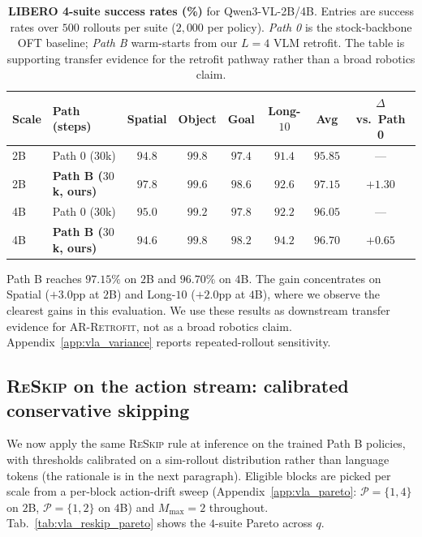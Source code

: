 \documentclass{article}
\newcommand{\reskip}{\textsc{ReSkip}}
\newcommand{\retrofit}{\textsc{AR-Retrofit}}
\begin{document}
\begin{table}[t]
\caption{\textbf{LIBERO 4-suite success rates (\%)} for Qwen3-VL-2B/4B. Entries are success rates over $500$ rollouts per suite ($2{,}000$ per policy). \emph{Path 0} is the stock-backbone OFT baseline; \emph{Path B} warm-starts from our $L{=}4$ VLM retrofit. The table is supporting transfer evidence for the retrofit pathway rather than a broad robotics claim.}
\label{tab:vla_libero}
\centering\small
\setlength{\tabcolsep}{4pt}
\begin{tabular}{llcccccc}
\toprule
Scale & Path (steps) & Spatial & Object & Goal & Long-$10$ & \textbf{Avg} & $\Delta$ vs.\ Path 0 \\
\midrule
2B & Path 0 ($30$k)                & $94.8$ & $99.8$ & $97.4$ & $91.4$ & $95.85$ & --- \\
2B & \textbf{Path B ($30$k, ours)} & $\mathbf{97.8}$ & $99.6$ & $\mathbf{98.6}$ & $\mathbf{92.6}$ & $\mathbf{97.15}$ & $\mathbf{+1.30}$ \\
\midrule
4B & Path 0 ($30$k)                & $95.0$ & $99.2$ & $97.8$ & $92.2$ & $96.05$ & --- \\
4B & \textbf{Path B ($30$k, ours)} & $94.6$ & $\mathbf{99.8}$ & $\mathbf{98.2}$ & $\mathbf{94.2}$ & $\mathbf{96.70}$ & $\mathbf{+0.65}$ \\
\bottomrule
\end{tabular}
\end{table}

Path B reaches $97.15\%$ on $2$B and $96.70\%$ on $4$B. The gain concentrates on Spatial ($+3.0$pp at $2$B) and Long-$10$ ($+2.0$pp at $4$B), where we observe the clearest gains in this evaluation. We use these results as downstream transfer evidence for \retrofit{}, not as a broad robotics claim. Appendix~\ref{app:vla_variance} reports repeated-rollout sensitivity.

\subsection{\reskip{} on the action stream: calibrated conservative skipping}
\label{sec:vla_reskip}

We now apply the same \reskip{} rule at inference on the trained Path B policies, with thresholds calibrated on a sim-rollout distribution rather than language tokens (the rationale is in the next paragraph). Eligible blocks are picked per scale from a per-block action-drift sweep (Appendix~\ref{app:vla_pareto}: $\mathcal{P}{=}\{1,4\}$ on $2$B, $\mathcal{P}{=}\{1,2\}$ on $4$B) and $M_{\max}{=}2$ throughout. Tab.~\ref{tab:vla_reskip_pareto} shows the $4$-suite Pareto across $q$.
\end{document}
